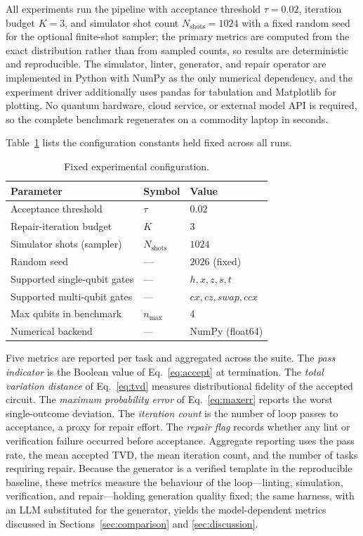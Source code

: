 \documentclass[11pt,a4paper]{article}
\begin{document}
All experiments run the pipeline with acceptance threshold $\tau=0.02$, iteration budget $K=3$, and simulator shot count $N_{\mathrm{shots}}=1024$ with a fixed random seed for the optional finite-shot sampler; the primary metrics are computed from the exact distribution rather than from sampled counts, so results are deterministic and reproducible. The simulator, linter, generator, and repair operator are implemented in Python with NumPy as the only numerical dependency, and the experiment driver additionally uses pandas for tabulation and Matplotlib for plotting. No quantum hardware, cloud service, or external model API is required, so the complete benchmark regenerates on a commodity laptop in seconds.

Table~\ref{tab:config} lists the configuration constants held fixed across all runs.

\begin{table}[H]
\centering
\caption{Fixed experimental configuration.}
\label{tab:config}
\small
\begin{tabular}{@{}lll@{}}
\toprule
\textbf{Parameter} & \textbf{Symbol} & \textbf{Value} \\
\midrule
Acceptance threshold & $\tau$ & $0.02$ \\
Repair-iteration budget & $K$ & $3$ \\
Simulator shots (sampler) & $N_{\mathrm{shots}}$ & $1024$ \\
Random seed & --- & $2026$ (fixed) \\
Supported single-qubit gates & --- & $h,x,z,s,t$ \\
Supported multi-qubit gates & --- & $cx,cz,swap,ccx$ \\
Max qubits in benchmark & $n_{\max}$ & $4$ \\
Numerical backend & --- & NumPy (float64) \\
\bottomrule
\end{tabular}
\end{table}

Five metrics are reported per task and aggregated across the suite. The \emph{pass indicator} is the Boolean value of Eq.~\eqref{eq:accept} at termination. The \emph{total variation distance} of Eq.~\eqref{eq:tvd} measures distributional fidelity of the accepted circuit. The \emph{maximum probability error} of Eq.~\eqref{eq:maxerr} reports the worst single-outcome deviation. The \emph{iteration count} is the number of loop passes to acceptance, a proxy for repair effort. The \emph{repair flag} records whether any lint or verification failure occurred before acceptance. Aggregate reporting uses the pass rate, the mean accepted TVD, the mean iteration count, and the number of tasks requiring repair. Because the generator is a verified template in the reproducible baseline, these metrics measure the behaviour of the loop---linting, simulation, verification, and repair---holding generation quality fixed; the same harness, with an LLM substituted for the generator, yields the model-dependent metrics discussed in Sections~\ref{sec:comparison} and \ref{sec:discussion}.
\end{document}
